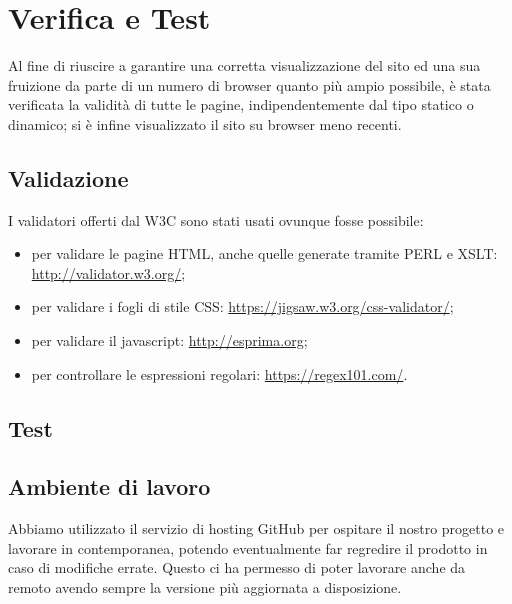 \section{Verifica e Test}{
	Al fine di riuscire a garantire una corretta visualizzazione del sito ed una sua fruizione da parte di un numero di browser quanto più ampio possibile, è stata verificata la validità di tutte le pagine, indipendentemente dal tipo statico o dinamico; si è infine visualizzato il sito su browser meno recenti.
	\subsection{Validazione}{
		I validatori offerti dal W3C sono stati usati ovunque fosse possibile:
		\begin{itemize}\itemsep1pt
			\item per validare le pagine HTML, anche quelle generate tramite PERL e XSLT: \url{http://validator.w3.org/};
			\item per validare i fogli di stile CSS: \url{https://jigsaw.w3.org/css-validator/};
			\item per validare il javascript: \href{http://esprima.org/demo/validate.html}{http://esprima.org};
			\item per controllare le espressioni regolari: \url{https://regex101.com/}.
		\end{itemize}
	}
	\subsection{Test}{
	}
	\subsection{Ambiente di lavoro}{
		Abbiamo utilizzato il servizio di hosting GitHub per ospitare il nostro progetto e lavorare in contemporanea, potendo eventualmente far regredire il prodotto in caso di modifiche errate. Questo ci ha permesso di poter lavorare anche da remoto avendo sempre la versione più aggiornata a disposizione.
	}
}
